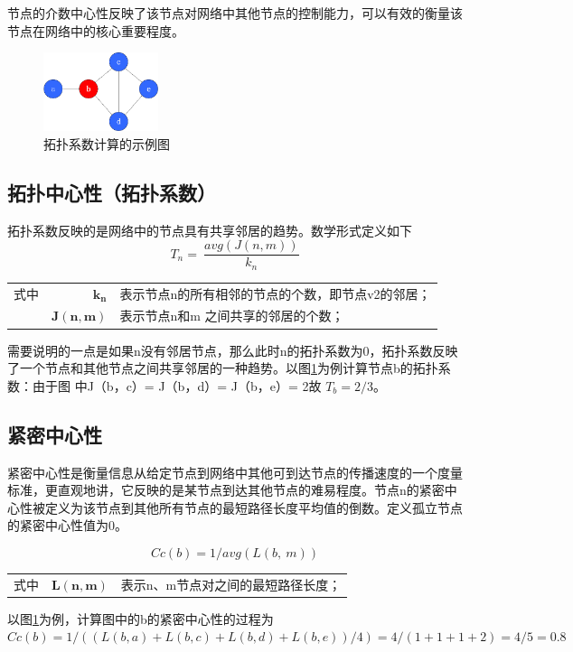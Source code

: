 节点的介数中心性反映了该节点对网络中其他节点的控制能力，可以有效的衡量该节点在网络中的核心重要程度。



\begin{figure}[h]
\centering
\includegraphics[width = 0.3\textwidth]{toplog}
\caption[fig25]{拓扑系数计算的示例图}
\label{fig25}
\end{figure}

\subsection{拓扑中心性（拓扑系数）}
拓扑系数反映的是网络中的节点具有共享邻居的趋势。数学形式定义如下
\begin{equation}\label{eq25}
	T_{n} =\ \frac{avg( J( n,m))}{k_{n}}
\end{equation}
\begin{tabularx}{\textwidth}{@{}l@{\quad}r@{———}X@{}}
式中 & $\boldsymbol{k_{n}}$ &  表示节点n的所有相邻的节点的个数，即节点v2的邻居；\\
	& $\boldsymbol{ J( n,m)}$ &   表示节点n和m  之间共享的邻居的个数；\\
\end{tabularx}\vspace{3.15bp}
需要说明的一点是如果n没有邻居节点，那么此时n的拓扑系数为0，拓扑系数反映了一个节点和其他节点之间共享邻居的一种趋势。以图\ref{fig25}为例计算节点b的拓扑系数：由于图 中J（b，c）= J（b，d）= J（b，e）= 2故 $T_{b}=2/3$。


\subsection{紧密中心性}
紧密中心性是衡量信息从给定节点到网络中其他可到达节点的传播速度的一个度量标准，更直观地讲，它反映的是某节点到达其他节点的难易程度。节点n的紧密中心性被定义为该节点到其他所有节点的最短路径长度平均值的倒数。定义孤立节点的紧密中心性值为0。

\begin{equation}\label{eq27}
	Cc( b) =1/avg( L( b,\ m))
\end{equation}

\begin{tabularx}{\textwidth}{@{}l@{\quad}r@{———}X@{}}
式中 & $\boldsymbol{L(n, m)}$ &  表示n、m节点对之间的最短路径长度；\\
\end{tabularx}\vspace{3.15bp}
以图\ref{fig25}为例，计算图中的b的紧密中心性的过程为$Cc(b) = 1/ ( (L(b, a) + L(b, c) + L(b, d) + L(b, e)) / 4) = 4/ (1 + 1 + 1 + 2) = 4/5= 0.8$

